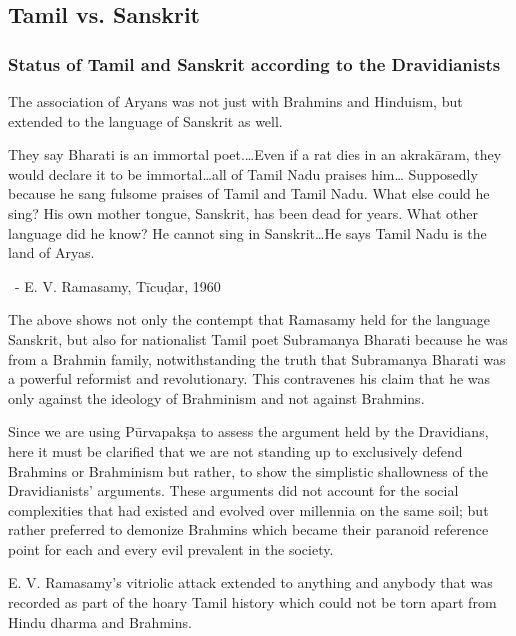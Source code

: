 \subsection*{Tamil vs. Sanskrit}

\subsubsection*{Status of Tamil and Sanskrit according to the Dravidianists}

\vskip -5pt

The association of Aryans was not just with Brahmins and Hinduism, but extended to the language of Sanskrit as well.

\begin{myquote}
They say Bharati is an immortal poet.…Even if a rat dies in an akrakāram, they would declare it to be immortal…all of Tamil Nadu praises him… Supposedly because he sang fulsome praises of Tamil and Tamil Nadu. What else could he sing? His own mother tongue, Sanskrit, has been dead for years. What other language did he know? He cannot sing in Sanskrit…He says Tamil Nadu is the land of Aryas.

~\hfill - E. V. Ramasamy, Tīcuḍar, 1960
\end{myquote}

The above shows not only the contempt that Ramasamy held for the language Sanskrit, but also for nationalist Tamil poet Subramanya Bharati because he was from a Brahmin family, notwithstanding the truth that Subramanya Bharati was a powerful reformist and revolutionary. This contravenes his claim that he was only against the ideology of Brahminism and not against Brahmins.

Since we are using Pūrvapakṣa to assess the argument held by the Dravidians, here it must be clarified that we are not standing up to exclusively defend Brahmins or Brahminism but rather, to show the simplistic shallowness of the Dravidianists’ arguments. These arguments did not account for the social complexities that had existed and evolved over millennia on the same soil; but rather preferred to demonize Brahmins which became their paranoid reference point for each and every evil prevalent in the society.

E. V. Ramasamy’s vitriolic attack extended to anything and anybody that was recorded as part of the hoary Tamil history which could not be torn apart from Hindu dharma and Brahmins.

